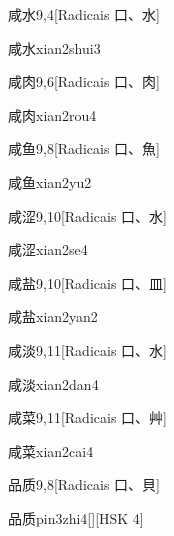 \begin{entry}{咸水}{9,4}[Radicais ⼝、⽔]
  \begin{phonetics}{咸水}{xian2shui3}
  \end{phonetics}
\end{entry}

\begin{entry}{咸肉}{9,6}[Radicais ⼝、⾁]
  \begin{phonetics}{咸肉}{xian2rou4}
  \end{phonetics}
\end{entry}

\begin{entry}{咸鱼}{9,8}[Radicais ⼝、⿂]
  \begin{phonetics}{咸鱼}{xian2yu2}
  \end{phonetics}
\end{entry}

\begin{entry}{咸涩}{9,10}[Radicais ⼝、⽔]
  \begin{phonetics}{咸涩}{xian2se4}
  \end{phonetics}
\end{entry}

\begin{entry}{咸盐}{9,10}[Radicais ⼝、⽫]
  \begin{phonetics}{咸盐}{xian2yan2}
  \end{phonetics}
\end{entry}

\begin{entry}{咸淡}{9,11}[Radicais ⼝、⽔]
  \begin{phonetics}{咸淡}{xian2dan4}
  \end{phonetics}
\end{entry}

\begin{entry}{咸菜}{9,11}[Radicais ⼝、⾋]
  \begin{phonetics}{咸菜}{xian2cai4}
  \end{phonetics}
\end{entry}

\begin{entry}{品质}{9,8}[Radicais ⼝、⾙]
  \begin{phonetics}{品质}{pin3zhi4}[][HSK 4]
  \end{phonetics}
\end{entry}

